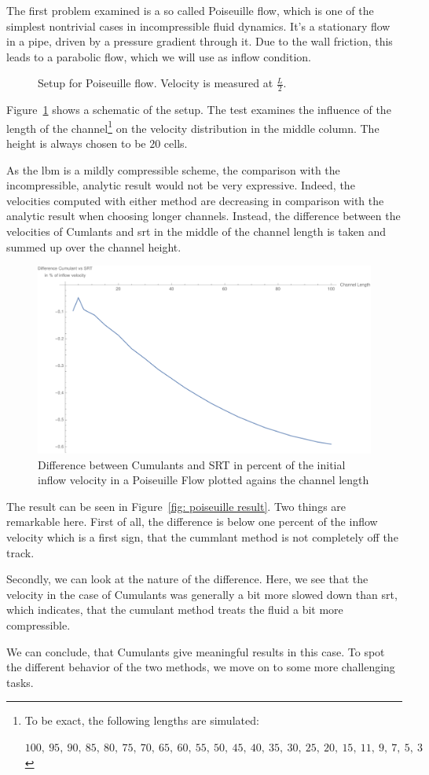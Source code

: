 The first problem examined is a so called Poiseuille flow, which is one of the simplest nontrivial cases in incompressible fluid dynamics.
It's a stationary flow in a pipe, driven by a pressure gradient through it.
Due to the wall friction, this leads to a parabolic flow, which we will use as inflow condition.

\begin{figure}
  \centering
  
  \caption{Setup for Poiseuille flow. Velocity is measured at $\frac{L}{2}$.}
\label{fig: poiseuille}
\end{figure}

Figure~\ref{fig: poiseuille} shows a schematic of the setup.
The test examines the influence of the length of the channel\footnote{To be exact, the following lengths are simulated:\par
 $100,\ 95,\ 90,\ 85,\ 80,\ 75,\ 70,\ 65,\ 60,\ 55,\ 50,\ 45,\ 40,\ 35,\ 30,\ 25,\ 20,\ 15,\ 11,\ 9,\ 7,\ 5,\ 3$
} on the velocity distribution in the middle column.
The height is always chosen to be $20$ cells.

As the \gls{lbm} is a mildly compressible scheme, the comparison with the incompressible, analytic result would not be very expressive.
Indeed, the velocities computed with either method are decreasing in comparison with the analytic result when choosing longer channels.
Instead, the difference between the velocities of Cumlants and \gls{srt} in the middle of the channel length is taken and summed up over the channel height.

\begin{figure}
  \centering
  \includegraphics[width=0.8\linewidth]{../figures/poiseuille.pdf} %
  \caption{Difference between Cumulants and SRT in percent of the initial inflow velocity in a Poiseuille Flow plotted agains the channel length}
\label{fig: poiseuille result}
\end{figure}

The result can be seen in Figure~\eqref{fig: poiseuille result}.
Two things are remarkable here.
First of all, the difference is below one percent of the inflow velocity which is a first sign, that the cummlant method is not completely off the track.

Secondly, we can look at the nature of the difference.
Here, we see that the velocity in the case of Cumulants was generally a bit more slowed down than \gls{srt}, which indicates, that the cumulant method treats the fluid a bit more compressible.

We can conclude, that Cumulants give meaningful results in this case.
To spot the different behavior of the two methods, we move on to some more challenging tasks.
